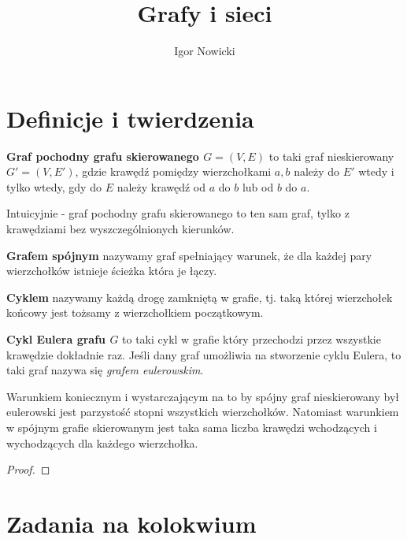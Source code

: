 \documentclass[11pt]{article}
\title{Grafy i sieci}
\author{Igor Nowicki}
\theoremstyle{definition}
\begin{document}
\maketitle

\section{Definicje i twierdzenia}

\textbf{Graf pochodny grafu skierowanego $G = (V,E)$} to taki graf nieskierowany $G' = (V, E')$, gdzie krawędź pomiędzy wierzchołkami $a,b$ należy do $E'$ wtedy i tylko wtedy, gdy do $E$ należy krawędź od $a$ do $b$ lub od $b$ do $a$.

Intuicyjnie - graf pochodny grafu skierowanego to ten sam graf, tylko z krawędziami bez wyszczególnionych kierunków.

\textbf{Grafem spójnym} nazywamy graf spełniający warunek, że dla każdej pary wierzchołków istnieje ścieżka która je łączy.

\textbf{Cyklem} nazywamy każdą drogę zamkniętą w grafie, tj. taką której wierzchołek końcowy jest tożsamy z wierzchołkiem początkowym.

\textbf{Cykl Eulera grafu $G$} to taki cykl w grafie który przechodzi przez wszystkie krawędzie dokładnie raz. Jeśli dany graf umożliwia na stworzenie cyklu Eulera, to taki graf nazywa się \textit{grafem eulerowskim}.

Warunkiem koniecznym i wystarczającym na to by spójny graf nieskierowany był eulerowski jest parzystość stopni wszystkich wierzchołków. Natomiast warunkiem w spójnym grafie skierowanym jest taka sama liczba krawędzi wchodzących i wychodzących dla każdego wierzchołka.



\begin{proof}

\end{proof}

\section{Zadania na kolokwium}
\end{document}
